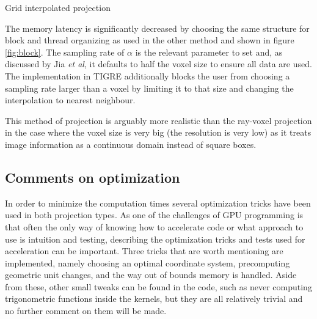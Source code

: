 \begin{algorithm}

\caption{Grid interpolated projection
\label{alg:gridinterp}}
\begin{algorithmic}[1]
    
\EndFor
{}
\Ensure{} 
\end{algorithmic}

\end{algorithm}


The memory latency is significantly decreased by choosing the same structure for block and thread organizing as used in the other method and shown in figure \ref{fig:block}. The sampling rate of $\alpha$ is the relevant parameter to set and, as discussed by Jia \textit{et al}\cite{jia2012gpu}, it defaults to half the voxel size to ensure all data are used. The implementation in TIGRE additionally blocks the user from choosing a sampling rate larger than a voxel by limiting it to that size and changing the interpolation to nearest neighbour.

This method of projection is arguably more realistic than the ray-voxel projection in the case where the voxel size is very big (the resolution is very low) as it treats image information as a continuous domain instead of square boxes.

\subsection{Comments on optimization}

In order to minimize the computation times several optimization tricks have been used in both projection types. As one of the challenges of GPU programming is that often the only way of knowing how to accelerate code or what approach to use is intuition and testing, describing the optimization tricks and tests used for acceleration can be important. Three tricks that are worth mentioning are implemented, namely choosing an optimal coordinate system, precomputing geometric unit changes, and the way out of bounds memory is handled. Aside from these, other small tweaks can be found in the code, such as never computing trigonometric functions inside the kernels, but they are all relatively trivial and no further comment on them will be made.

